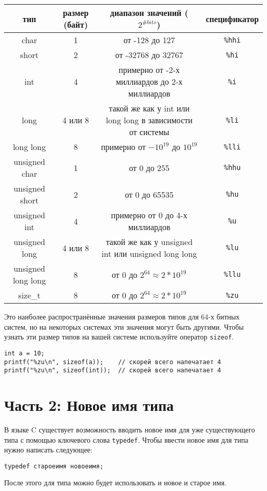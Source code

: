 \documentclass{article}
\begin{document}
\begin{center}
\begin{tabular}{ c c c c }
 тип & размер (байт) & диапазон значений ($2^{\# bits}$) & спецификатор \\ \hline
 char & 1 & от -128 до 127 & \texttt{\%hhi} \\ 
 short & 2 & от -32768 до 32767 & \texttt{\%hi}  \\  
 int & 4 & примерно от -2-х миллиардов до 2-х миллиардов & \texttt{\%i}  \\  
 long & 4 или 8 & такой же как у int или long long в зависимости от системы & \texttt{\%li}  \\  
 long long & 8 & примерно от $-10^{19}$ до $10^{19}$ & \texttt{\%lli}  \\  
 unsigned char & 1 & от 0 до 255 & \texttt{\%hhu} \\ 
 unsigned short & 2 & от 0 до 65535 & \texttt{\%hu}  \\  
 unsigned int & 4 & примерно от 0 до 4-х миллиардов & \texttt{\%u}  \\  
 unsigned long & 4 или 8 & такой же как у unsigned int или unsigned long long & \texttt{\%lu}  \\  
 unsigned long long & 8 & от 0 до $2^{64} \approx 2*10^{19}$  & \texttt{\%llu}  \\  
 size\_t & 8 & от 0 до $2^{64} \approx 2*10^{19}$ & \texttt{\%zu} \\ \hline 
\end{tabular}
\end{center}
Это наиболее распространённые значения размеров типов для 64-х битных систем, но на некоторых системах эти значения могут быть другими.
Чтобы узнать эти размер типов на вашей системе используйте оператор \texttt{sizeof}. 
\begin{lstlisting}
int a = 10;
printf("%zu\n", sizeof(a));    // скорей всего напечатает 4
printf("%zu\n", sizeof(int));  // скорей всего напечатает 4
\end{lstlisting}

\section*{Часть 2: Новое имя типа}
В языке C существует возможность вводить новое имя для уже существующего типа с помощью ключевого слова \texttt{typedef}. Чтобы ввести новое имя для типа нужно написать следующее:
\begin{lstlisting}
typedef староеимя новоеимя;
\end{lstlisting}
После этого для типа можно будет использовать и новое и старое имя.
\end{document}
